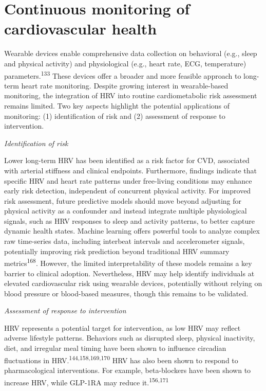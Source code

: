 \documentclass[
  a4paper,
  headsepline=true,
  open=left]{scrbook}
\begin{document}
\hypertarget{continuous-monitoring-of-cardiovascular-health}{%
\section{Continuous monitoring of cardiovascular
health}\label{continuous-monitoring-of-cardiovascular-health}}

Wearable devices enable comprehensive data collection on behavioral
(e.g., sleep and physical activity) and physiological (e.g., heart rate,
ECG, temperature) parameters.\textsuperscript{133} These devices offer a
broader and more feasible approach to long-term heart rate monitoring.
Despite growing interest in wearable-based monitoring, the integration
of HRV into routine cardiometabolic risk assessment remains limited. Two
key aspects highlight the potential applications of monitoring: (1)
identification of risk and (2) assessment of response to intervention.

\emph{Identification of risk}

Lower long-term HRV has been identified as a risk factor for CVD,
associated with arterial stiffness and clinical endpoints. Furthermore,
findings indicate that specific HRV and heart rate patterns under
free-living conditions may enhance early risk detection, independent of
concurrent physical activity. For improved risk assessment, future
predictive models should move beyond adjusting for physical activity as
a confounder and instead integrate multiple physiological signals, such
as HRV responses to sleep and activity patterns, to better capture
dynamic health states. Machine learning offers powerful tools to analyze
complex raw time-series data, including interbeat intervals and
accelerometer signals, potentially improving risk prediction beyond
traditional HRV summary metrics\textsuperscript{168}. However, the
limited interpretability of these models remains a key barrier to
clinical adoption. Nevertheless, HRV may help identify individuals at
elevated cardiovascular risk using wearable devices, potentially without
relying on blood pressure or blood-based measures, though this remains
to be validated.

\emph{Assessment of response to intervention}

HRV represents a potential target for intervention, as low HRV may
reflect adverse lifestyle patterns. Behaviors such as disrupted sleep,
physical inactivity, diet, and irregular meal timing have been shown to
influence circadian fluctuations in
HRV.\textsuperscript{144,158,169,170} HRV has also been shown to respond
to pharmacological interventions. For example, beta-blockers have been
shown to increase HRV, while GLP-1RA may reduce
it.\textsuperscript{156,171}
\end{document}
